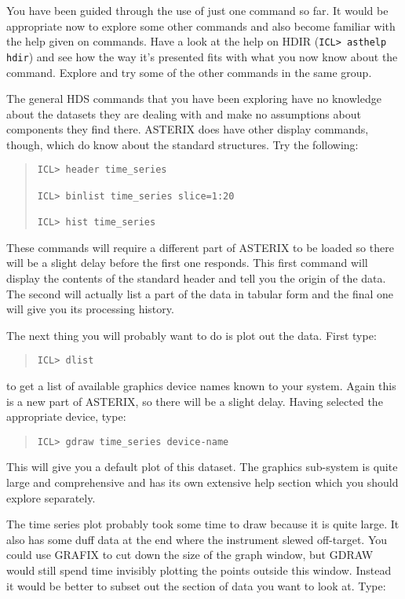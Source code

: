 \documentclass{book}
\renewcommand{\_}{{\tt\char'137}}     %
\begin{document}
You have been guided through the use of just one command so far. It
would be appropriate now to explore some other commands and also
become familiar with the help given on commands. Have a look at the
help on HDIR ({\tt ICL> asthelp hdir}) and see how the way it's presented
fits with what you now know about the command. Explore and try some
of the other commands in the same group.

The general HDS commands that you have been exploring have no
knowledge about the datasets they are dealing with and make no
assumptions about components they find there. ASTERIX does have
other display commands, though, which do know about the standard
structures. Try the following:

\begin{quote}\begin{verbatim}
ICL> header time_series

ICL> binlist time_series slice=1:20

ICL> hist time_series
\end{verbatim}\end{quote}
These commands will require a different part of ASTERIX to be loaded
so there will be a slight delay before the first one responds. This
first command will display the contents of the standard header and
tell you the origin of the data. The second will actually list a part
of the data in tabular form and the final one will give you its
processing history.

The next thing you will probably want to do is plot out the data. First
type:

\begin{quote}\begin{verbatim}
ICL> dlist
\end{verbatim}\end{quote}
to get a list of available graphics device names known to your system.
Again this is a new part of ASTERIX, so there will be a slight delay.
Having selected the appropriate device, type:

\begin{quote}\begin{verbatim}
ICL> gdraw time_series device-name
\end{verbatim}\end{quote}
This will give you a default plot of this dataset. The graphics sub-system
is quite large and comprehensive and has its own extensive help section
which you should explore separately.

The time series plot probably took some time to draw because it is quite
large. It also has some duff data at the end where the instrument slewed
off-target. You could use GRAFIX to cut down the size of the graph
window, but GDRAW would still spend time invisibly plotting the points
outside this window. Instead it would be better to subset out the
section of data you want to look at. Type:
\end{document}
